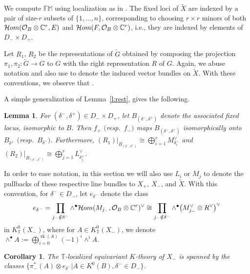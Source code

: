 \documentclass[11pt]{article}
\numberwithin{equation}{section}
\newtheorem{Corollary}[Theorem]{Corollary}
\newtheorem{Lemma}[Theorem]{Lemma}
\numberwithin{equation}{section}
\newcommand{\cc}[1]{\mathcal{#1}} %
\newcommand{\CC}{\mathbb{C}}
\newcommand{\torus}{\mathbb{T}}
\newcommand{\FM}{\mathbb{FM}}
\newcommand{\op}[1]{\operatorname{#1}}
\newcommand{\F}{F}
\newcommand{\E}{E}
\newcommand{\MB}{M}
\newcommand{\LB}{L}
\begin{document}
We compute $\FM $ using localization as in \cite{Thomason}.
The fixed loci of $\tilde X$ are indexed by a pair of size-$r$ subsets of $\{1, \dots, n\}$,
corresponding to choosing $r \times r$ minors of both $\mathcal{H}{\rm om}(\cc O_B \otimes \CC^r, \E)$ and $\mathcal{H}{\rm om}(\F, \cc O_B \otimes \CC^r)$, i.e., they are indexed by elements of $D_- \times D_+$.

Let $R_1$, $R_2$ be the representations of $\tilde G$ obtained by composing the projection $\pi_1, \pi_2\colon \tilde G \to G$ to $G$ with the right representation $R$ of $G$. Again, we abuse notation and also use  to denote the induced vector bundles on $\tilde X$.
With these conventions, we observe that .


A simple generalization of Lemma~\ref{l:rest}, gives the following.
\begin{Lemma}\label{l:rest2}
For $(\delta^-, \delta^+) \in D_{-} \times D_{+}$,
let $B_{(\delta^-, \delta^+)} $ denote the associated fixed locus, isomorphic to $B$. Then $f_{+}$ $($resp.\ $f_-)$ maps $B_{(\delta^-, \delta^+)} $ isomorphically onto $B_{\delta^+}$ $($resp.\ $B_{\delta^-})$. Furthermore,
$(R_1)|_{B_{(\delta^-, \delta^+)}} \cong \bigoplus_{i=1}^r \MB_{\delta^-_i}^\vee$ and $(R_2)|_{B_{(\delta^-, \delta^+)}} \cong \bigoplus_{j=1}^r \LB_{\delta^+_j}^\vee$.
\end{Lemma}




In order to ease notation, in this section we will also use $L_i$ or $M_j$ to denote the pullbacks of these respective line bundles to $X_+$, $X_-$, and $\tilde X.$
With this convention, for $\delta^- \in D_-$, let $e_{\delta^-}$ denote the class{\samepage
\begin{align}
e_{\delta^-} = \prod_{j_- \notin \delta^-} \wedge^\bullet \mathcal{H}{\rm om}(\MB_{j_-}, \cc O_B \otimes \CC^r)^\vee
\cong \prod_{j_- \notin \delta^-} \wedge^\bullet \bigl(\MB_{j_-}^\vee \otimes R^\vee\bigr)^\vee \label{edm}
\end{align}
in $K^0_\torus(X_-)$, where for $A \in K^0_\torus(X_-)$, we denote $\wedge^\bullet A := \bigoplus_{i=0}^{\op{rk}(A)} (-1)^i \wedge^i A$.}



\begin{Corollary}\label{c:gen}
The $\torus$-localized equivariant $K$-theory of $X_-$ is spanned by the classes $\bigl\{\pi_-^*(A) \otimes e_{\delta^-} | A \in K^0(B), \delta^- \in D_{-}\bigr\}$.
\end{Corollary}
\end{document}

